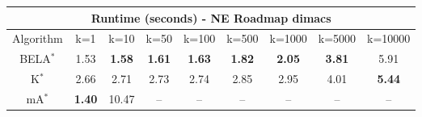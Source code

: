 \begin{tabular}{c|cccccccc}\toprule
\multicolumn{9}{c}{Runtime (seconds) - NE Roadmap dimacs}\\ \midrule
Algorithm & k=1 & k=10 & k=50 & k=100 & k=500 & k=1000 & k=5000 & k=10000 \\ \midrule
BELA$^*$ & 1.53 & \textbf{1.58} & \textbf{1.61} & \textbf{1.63} & \textbf{1.82} & \textbf{2.05} & \textbf{3.81} & 5.91 \\
K$^*$ & 2.66 & 2.71 & 2.73 & 2.74 & 2.85 & 2.95 & 4.01 & \textbf{5.44} \\
mA$^*$ & \textbf{1.40} & 10.47 & -- & -- & -- & -- & -- & -- \\ \bottomrule 
\end{tabular}
